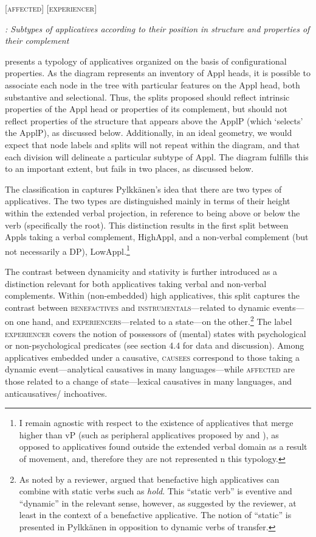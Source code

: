 \documentclass[output=paper,modfonts,nonflat]{langsci/langscibook}
\begin{document}
                        [\textsc{affected}]             [\textsc{experiencer}]

\textit{: Subtypes of applicatives according to their position in structure and properties of their complement}

 presents a typology of applicatives organized on the basis of configurational properties. As the diagram represents an inventory of Appl heads, it is possible to associate each node in the tree with particular features on the Appl head, both substantive and selectional. Thus, the splits proposed should reflect intrinsic properties of the Appl head or properties of its complement, but should not reflect properties of the structure that appears above the ApplP (which ‘selects’ the ApplP), as discussed below. Additionally, in an ideal geometry, we would expect that node labels and splits will not repeat within the diagram, and that each division will delineate a particular subtype of Appl. The diagram fulfills this to an important extent, but fails in two places, as discussed below.

The classification in  captures Pylkkänen’s idea that there are two types of applicatives. The two types are distinguished mainly in terms of their height within the extended verbal projection, in reference to being above or below the verb (specifically the root). This distinction results in the first split between Appls taking a verbal complement, HighAppl, and a non-verbal complement (but not necessarily a DP), LowAppl.\footnote{I remain agnostic with respect to the existence of applicatives that merge higher than vP (such as peripheral applicatives proposed by \citealt{Kim2011} and \citealt{Tsai2018}), as opposed to applicatives found outside the extended verbal domain as a result of movement, and, therefore they are not represented n this typology.} 

The contrast between dynamicity and stativity is further introduced as a distinction relevant for both applicatives taking verbal and non-verbal complements. Within (non-embedded) high applicatives, this split captures the contrast between \textsc{benefactives} and \textsc{instrumentals}—related to dynamic events—on one hand, and \textsc{experiencers}—related to a state—on the other.\footnote{As noted by a reviewer, \citet{Pylkkänen2008} argued that benefactive high applicatives can combine with static verbs such as \textit{hold}. This “static verb” is eventive and “dynamic” in the relevant sense, however, as suggested by the reviewer, at least in the context of a benefactive applicative. The notion of “static” is presented in Pylkkänen in opposition to dynamic verbs of transfer.} The label \textsc{experiencer} covers the notion of possessors of (mental) states with psychological or non-psychological predicates (see section 4.4 for data and discussion). Among applicatives embedded under a causative, \textsc{causees} correspond to those taking a dynamic event—analytical causatives in many languages—while \textsc{affected} are those related to a change of state—lexical causatives in many languages, and anticausatives/ inchoatives. 
\end{document}
